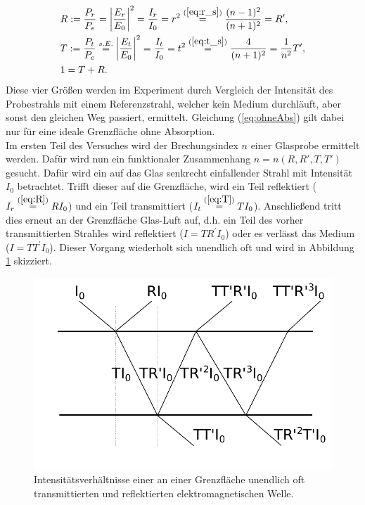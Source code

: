 	\begin{align}
		&R := \frac{P_r}{P_e} = \left\vert\frac{E_r}{E_0}\right\vert^2 = \frac{I_r}{I_0} = r^2 \overset{(\ref{eq:r_s})}{=} \frac{(n-1)^2}{(n+1)^2} = R^\prime, \label{eq:R}\\
		&T := \frac{P_t}{P_e} \overset{s.E.}{=} \left\vert\frac{E_t}{E_0}\right\vert^2 = \frac{I_t}{I_0} = t^2 \overset{(\ref{eq:t_s})}{=} \frac{4}{(n+1)^2} = \frac{1}{n^2}T^\prime, \label{eq:T}\\
		&1 = T + R. \label{eq:ohneAbs}
	\end{align}
	Diese vier Größen werden im Experiment durch Vergleich der Intensität des Probestrahls mit einem Referenzstrahl, welcher kein Medium durchläuft, aber sonst den gleichen Weg passiert, ermittelt. Gleichung (\ref{eq:ohneAbs}) gilt dabei nur für eine ideale Grenzfläche ohne Absorption.\\
	Im ersten Teil des Versuches wird der Brechungsindex $n$ einer Glasprobe ermittelt werden. Dafür wird nun ein funktionaler Zusammenhang $n = n(R, R', T, T')$ gesucht. Dafür wird ein auf das Glas senkrecht einfallender Strahl mit Intensität $I_0$ betrachtet. Trifft dieser auf die Grenzfläche, wird ein Teil reflektiert ($I_r \overset{(\ref{eq:R})}{=} R I_0$) und ein Teil transmittiert ($I_t \overset{(\ref{eq:T})}{=} T I_0$). Anschließend tritt dies erneut an der Grenzfläche Glas-Luft auf, d.h. ein Teil des vorher transmittierten Strahles wird reflektiert ($I = T R^\prime I_0$) oder es verlässt das Medium ($I = T T^\prime I_0$). Dieser Vorgang wiederholt sich unendlich oft und wird in Abbildung \ref{fig:brechungsindex} skizziert.
	\begin{figure}[ht]
		\centering
		\includegraphics[width=\linewidth]{pic/Brechungsindex.pdf}
		\caption{Intensitätsverhältnisse einer an einer Grenzfläche unendlich oft transmittierten und reflektierten elektromagnetischen Welle.}
		\label{fig:brechungsindex}	
	\end{figure}
